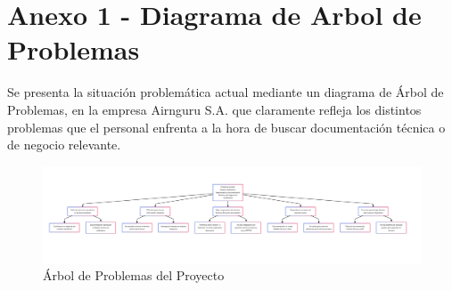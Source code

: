 \section*{Anexo 1 - Diagrama de Arbol de Problemas}
Se presenta la situación problemática actual mediante un diagrama de Árbol de Problemas, en la empresa Airnguru S.A. que claramente refleja los distintos problemas que el personal enfrenta a la hora de buscar documentación técnica o de negocio relevante.

\begin{figure}[H]
  \centering
  \includegraphics[width=\textwidth,keepaspectratio]{images/anexo_arbol_problema.png}
  \caption{Árbol de Problemas del Proyecto}
  \label{fig:arbol_problemas}
\end{figure}

